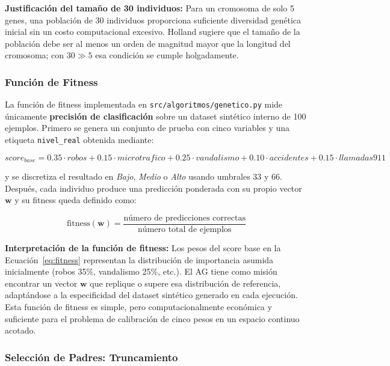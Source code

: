 \documentclass[11pt]{article}
\begin{document}
\textbf{Justificación del tamaño de 30 individuos:} Para un cromosoma de solo 5 genes, una población de 30 individuos proporciona suficiente diversidad genética inicial sin un costo computacional excesivo. Holland \cite{b2} sugiere que el tamaño de la población debe ser al menos un orden de magnitud mayor que la longitud del cromosoma; con $30 \gg 5$ esa condición se cumple holgadamente.

\subsubsection{Función de Fitness}

La función de fitness implementada en \texttt{src/algoritmos/genetico.py} mide únicamente \textbf{precisión de clasificación} sobre un dataset sintético interno de 100 ejemplos. Primero se genera un conjunto de prueba con cinco variables y una etiqueta \texttt{nivel\_real} obtenida mediante:

\begin{equation}
    score_{base} = 0.35 \cdot robos + 0.15 \cdot microtrafico + 0.25 \cdot vandalismo + 0.10 \cdot accidentes + 0.15 \cdot llamadas911
    \label{eq:fitness}
\end{equation}

y se discretiza el resultado en \textit{Bajo}, \textit{Medio} o \textit{Alto} usando umbrales 33 y 66. Después, cada individuo produce una predicción ponderada con su propio vector $\mathbf{w}$ y su fitness queda definido como:

\begin{equation}
    \text{fitness}(\mathbf{w}) = \frac{\text{número de predicciones correctas}}{\text{número total de ejemplos}}
\end{equation}

\textbf{Interpretación de la función de fitness:} Los pesos del score base en la Ecuación~\eqref{eq:fitness} representan la distribución de importancia asumida inicialmente (robos 35\%, vandalismo 25\%, etc.). El AG tiene como misión encontrar un vector $\mathbf{w}$ que replique o supere esa distribución de referencia, adaptándose a la especificidad del dataset sintético generado en cada ejecución. Esta función de fitness es simple, pero computacionalmente económica y suficiente para el problema de calibración de cinco pesos en un espacio continuo acotado.

\subsubsection{Selección de Padres: Truncamiento}
\end{document}
